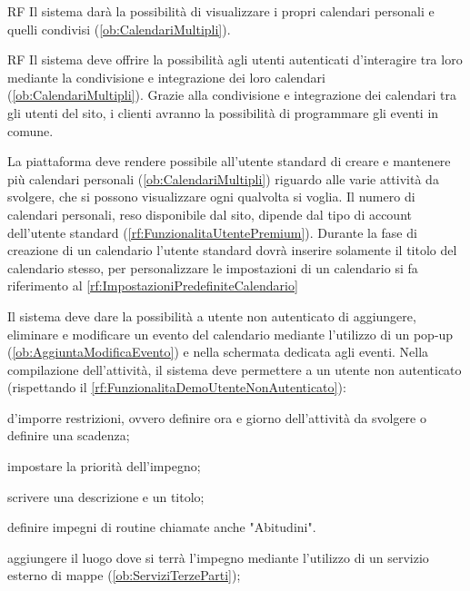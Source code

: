 \begin{listaPersonale}{RF}
	 Il sistema darà la possibilità di visualizzare i propri calendari personali e quelli condivisi (\ref{ob:CalendariMultipli}).
	\begin{listaPersonale2}{RF}
		 Il sistema deve offrire la possibilità agli utenti autenticati d'interagire tra loro mediante la condivisione e integrazione dei loro calendari (\ref{ob:CalendariMultipli}). Grazie alla condivisione e integrazione dei calendari tra gli utenti del sito, i clienti avranno la possibilità di programmare gli eventi in comune.

		 La piattaforma deve rendere possibile all'utente standard di creare e mantenere più calendari personali (\ref{ob:CalendariMultipli}) riguardo alle varie attività da svolgere, che si possono visualizzare ogni qualvolta si voglia. Il numero di calendari personali, reso disponibile dal sito, dipende dal tipo di account dell'utente standard (\ref{rf:FunzionalitaUtentePremium}). Durante la fase di creazione di un calendario l'utente standard dovrà inserire solamente il titolo del calendario stesso, per personalizzare le impostazioni di un calendario si fa riferimento al \ref{rf:ImpostazioniPredefiniteCalendario}
	\end{listaPersonale2}

	 Il sistema deve dare la possibilità a utente non autenticato di aggiungere, eliminare e modificare un evento del calendario mediante l'utilizzo di un pop-up (\ref{ob:AggiuntaModificaEvento}) e nella schermata dedicata agli eventi. Nella compilazione dell'attività, il sistema deve permettere a un utente non autenticato (rispettando il \ref{rf:FunzionalitaDemoUtenteNonAutenticato}):
	\begin{listaPersonale2}[RF]{}
		 d'imporre restrizioni, ovvero definire ora e giorno dell'attività da svolgere o definire una scadenza;

		 impostare la priorità dell'impegno;

		 scrivere una descrizione e un titolo;

		 definire impegni di routine chiamate anche "Abitudini".

		 aggiungere il luogo dove si terrà l'impegno mediante l'utilizzo di un servizio esterno di mappe (\ref{ob:ServiziTerzeParti});


\end{listaPersonale2}
\end{listaPersonale}
